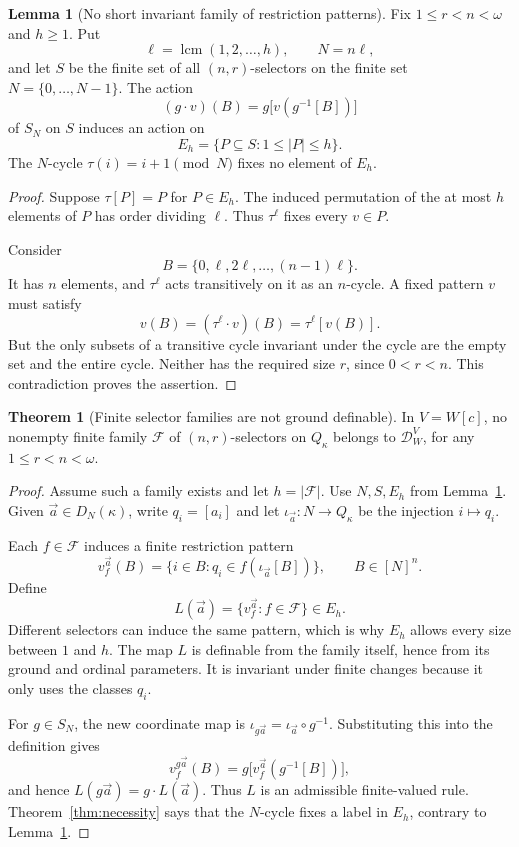 \documentclass[11pt,letterpaper]{article}
\theoremstyle{definition}
\newtheorem{theorem}[definition]{Theorem}
\newtheorem{lemma}[definition]{Lemma}
\numberwithin{equation}{section}
\newcommand{\lcm}{\operatorname{lcm}}
\newcommand{\Dg}{\mathcal D_W^V}
\begin{document}
\begin{lemma}[No short invariant family of restriction patterns]\label{lem:patterns}
Fix $1\le r<n<\omega$ and $h\ge1$. Put
\[
\ell=\lcm(1,2,\ldots,h),\qquad N=n\ell,
\]
and let $S$ be the finite set of all $(n,r)$-selectors on the finite set $N=\{0,\ldots,N-1\}$. The action
\[
(g\cdot v)(B)=g\bigl[v(g^{-1}[B])\bigr]
\]
of $S_N$ on $S$ induces an action on
\[
E_h=\{P\subseteq S:1\le |P|\le h\}.
\]
The $N$-cycle $\tau(i)=i+1\pmod N$ fixes no element of $E_h$.
\end{lemma}
\begin{proof}
Suppose $\tau[P]=P$ for $P\in E_h$. The induced permutation of the at most $h$ elements of $P$ has order dividing $\ell$. Thus $\tau^\ell$ fixes every $v\in P$.

Consider
\[
B=\{0,\ell,2\ell,\ldots,(n-1)\ell\}.
\]
It has $n$ elements, and $\tau^\ell$ acts transitively on it as an $n$-cycle. A fixed pattern $v$ must satisfy
\[
v(B)=(\tau^\ell\cdot v)(B)=\tau^\ell[v(B)].
\]
But the only subsets of a transitive cycle invariant under the cycle are the empty set and the entire cycle. Neither has the required size $r$, since $0<r<n$. This contradiction proves the assertion.
\end{proof}

\begin{theorem}[Finite selector families are not ground definable]\label{thm:families}
In $V=W[c]$, no nonempty finite family $\mathcal F$ of $(n,r)$-selectors on $Q_\kappa$ belongs to $\Dg$, for any $1\le r<n<\omega$.
\end{theorem}
\begin{proof}
Assume such a family exists and let $h=|\mathcal F|$. Use $N,S,E_h$ from Lemma~\ref{lem:patterns}. Given $\vec a\in D_N(\kappa)$, write $q_i=[a_i]$ and let $\iota_{\vec a}:N\to Q_\kappa$ be the injection $i\mapsto q_i$.

Each $f\in\mathcal F$ induces a finite restriction pattern
\[
v_f^{\vec a}(B)=\{i\in B:q_i\in f(\iota_{\vec a}[B])\},
\qquad B\in[N]^n.
\]
Define
\[
L(\vec a)=\{v_f^{\vec a}:f\in\mathcal F\}\in E_h.
\]
Different selectors can induce the same pattern, which is why $E_h$ allows every size between $1$ and $h$. The map $L$ is definable from the family itself, hence from its ground and ordinal parameters. It is invariant under finite changes because it only uses the classes $q_i$.

For $g\in S_N$, the new coordinate map is $\iota_{g\vec a}=\iota_{\vec a}\circ g^{-1}$. Substituting this into the definition gives
\[
v_f^{g\vec a}(B)=g\bigl[v_f^{\vec a}(g^{-1}[B])\bigr],
\]
and hence $L(g\vec a)=g\cdot L(\vec a)$. Thus $L$ is an admissible finite-valued rule. Theorem~\ref{thm:necessity} says that the $N$-cycle fixes a label in $E_h$, contrary to Lemma~\ref{lem:patterns}.
\end{proof}
\end{document}
